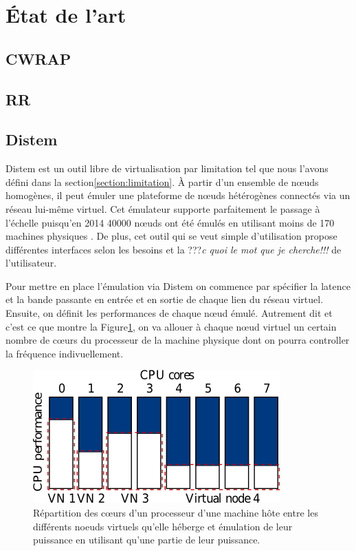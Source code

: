 \section{État de l'art}
\label{section:sota}
\subsection{CWRAP}

\subsection{RR}

\subsection{Distem}

Distem \citep{DISTEM} est un outil libre de virtualisation par limitation tel que nous l'avons défini dans la section\ref{section:limitation}. À partir d'un ensemble de n\oe uds homogènes, il peut émuler une plateforme de n\oe uds hétérogènes connectés via un réseau lui-même virtuel. Cet émulateur supporte parfaitement le passage à l'échelle puisqu'en 2014 40000 n\oe uds ont été émulés en utilisant moins de 170 machines physiques \citep{DISTEMbuchert2014emulation}. De plus, cet outil qui se veut simple d'utilisation propose différentes interfaces selon les besoins et la ???\textit{c quoi le mot que je cherche!!!} de l'utilisateur.

Pour mettre en place l'émulation via Distem on commence par spécifier la latence et la bande passante en entrée et en sortie de chaque lien du réseau virtuel. Ensuite, on définit les performances de chaque n\oe ud émulé. Autrement dit et c'est ce que montre la Figure\ref{Distem_core}, on va allouer à chaque n\oe ud virtuel un certain nombre de c\oe urs du processeur de la machine physique dont on pourra controller la fréquence indivuellement.

  \begin{figure}[H]
  \centering
  \includegraphics[scale=0.70]{Pictures/png/Distem_repartion_coeurs_v1}
  \caption{Répartition des c\oe urs d'un processeur d'une machine hôte entre les différents noeuds virtuels qu'elle héberge et émulation de leur puissance en utilisant qu'une partie de leur puissance.}
  \label{Distem_core}
  \end{figure}
  
